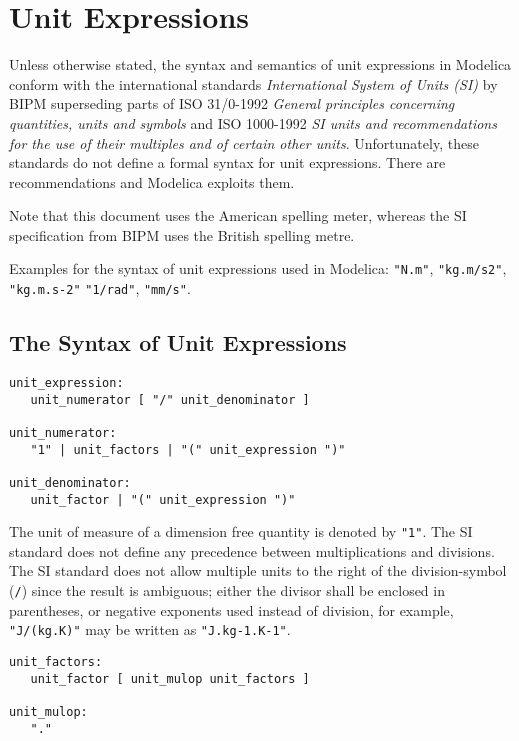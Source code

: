 \chapter{Unit Expressions}\label{unit-expressions}

Unless otherwise stated, the syntax and semantics of unit expressions in
Modelica conform with the international standards
\emph{International System of Units (SI)} by BIPM superseding parts of
ISO 31/0-1992
\emph{General principles concerning quantities, units and symbols} and ISO
1000-1992 \emph{SI units and recommendations for the use of their multiples
and of certain other units}.
Unfortunately, these standards do not define a formal syntax for
unit expressions. There are recommendations and Modelica exploits them.

Note that this document uses the American spelling meter, whereas the SI specification from BIPM uses the British spelling metre.

Examples for the syntax of unit expressions used in Modelica: \lstinline!"N.m"!,
\lstinline!"kg.m/s2"!, \lstinline!"kg.m.s-2"! \lstinline!"1/rad"!,
\lstinline!"mm/s"!.

\section{The Syntax of Unit Expressions}\label{the-syntax-of-unit-expressions}

\begin{lstlisting}[language=grammar]
unit_expression:
   unit_numerator [ "/" unit_denominator ]

unit_numerator:
   "1" | unit_factors | "(" unit_expression ")"

unit_denominator:
   unit_factor | "(" unit_expression ")"
\end{lstlisting}

The unit of measure of a dimension free quantity is denoted by \lstinline!"1"!. The
SI standard does not define any precedence between multiplications and
divisions. The SI standard does not allow multiple units to the right of the
division-symbol (\lstinline!/!) since the result is ambiguous; either the divisor shall be enclosed in parentheses,
or negative exponents used instead of division, for example, \lstinline!"J/(kg.K)"! may be written as \lstinline!"J.kg-1.K-1"!.

\begin{lstlisting}[language=grammar]
unit_factors:
   unit_factor [ unit_mulop unit_factors ]

unit_mulop:
   "."
\end{lstlisting}

